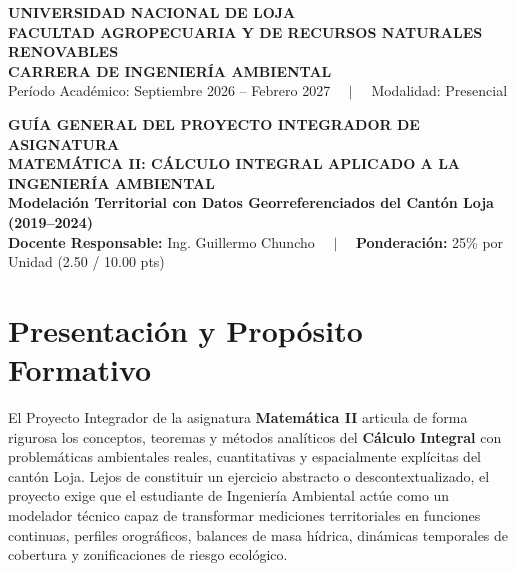 \documentclass[11pt,a4paper]{article}
\begin{document}
\thispagestyle{plain}

\begin{center}
  {\Large\textbf{\color{azulOscuro}UNIVERSIDAD NACIONAL DE LOJA}}\vspace{0.10cm}\\
  {\large\textbf{\color{unlbluelight}FACULTAD AGROPECUARIA Y DE RECURSOS NATURALES RENOVABLES}}\vspace{0.06cm}\\
  {\normalsize\textbf{CARRERA DE INGENIERÍA AMBIENTAL}}\vspace{0.10cm}\\
  {\small Período Académico: Septiembre 2026 -- Febrero 2027 $\quad\vert\quad$ Modalidad: Presencial}
\end{center}

\vspace{0.10cm}

\begin{bannerbox}
  \centering\color{white}
  {\Large\bfseries GUÍA GENERAL DEL PROYECTO INTEGRADOR DE ASIGNATURA}\\[0.12cm]
  {\normalsize\textbf{MATEMÁTICA II: CÁLCULO INTEGRAL APLICADO A LA INGENIERÍA AMBIENTAL}}\\[0.08cm]
  {\small\textbf{Modelación Territorial con Datos Georreferenciados del Cantón Loja (2019--2024)}}\\[0.10cm]
  {\footnotesize\textbf{Docente Responsable:} Ing. Guillermo Chuncho $\quad\vert\quad$ \textbf{Ponderación:} 25\% por Unidad (2.50 / 10.00 pts)}
\end{bannerbox}

\vspace{0.20cm}

\section{Presentación y Propósito Formativo}

El Proyecto Integrador de la asignatura \textbf{Matemática II} articula de forma rigurosa los conceptos, teoremas y métodos analíticos del \textbf{Cálculo Integral} con problemáticas ambientales reales, cuantitativas y espacialmente explícitas del cantón Loja. Lejos de constituir un ejercicio abstracto o descontextualizado, el proyecto exige que el estudiante de Ingeniería Ambiental actúe como un modelador técnico capaz de transformar mediciones territoriales en funciones continuas, perfiles orográficos, balances de masa hídrica, dinámicas temporales de cobertura y zonificaciones de riesgo ecológico.
\end{document}
